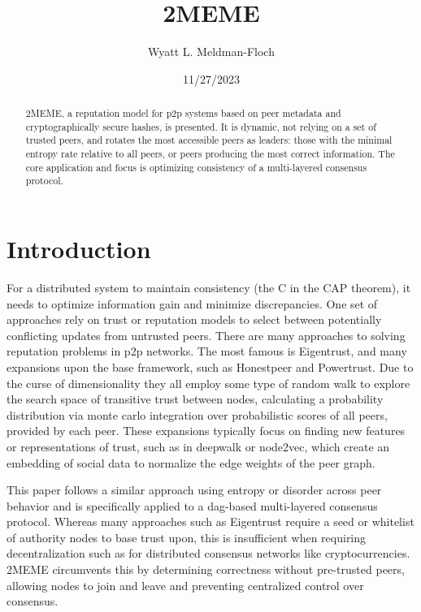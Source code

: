 \documentclass{article}
\title{2MEME}
\author{Wyatt L. Meldman-Floch}
\date{11/27/2023}
\begin{document}
\maketitle

\begin{abstract}
2MEME, a reputation model for p2p systems based on peer metadata and cryptographically secure hashes, is presented. It is dynamic, not relying on a set of trusted peers, and rotates the most accessible peers as leaders: those with the minimal entropy rate relative to all peers, or peers producing the most correct information. The core application and focus is optimizing consistency of a multi-layered consensus protocol. 

\end{abstract}

\tableofcontents

\setcounter{secnumdepth}{0}


\section{Introduction}
For a distributed system to maintain consistency (the C in the CAP theorem), it needs to optimize information gain and minimize discrepancies. One set of approaches rely on trust or reputation models to select between potentially conflicting updates from untrusted peers. There are many approaches to solving reputation problems in p2p networks. The most famous is Eigentrust, and many expansions upon the base framework, such as Honestpeer and Powertrust. Due to the curse of dimensionality they all employ some type of random walk to explore the search space of transitive trust between nodes, calculating a probability distribution via monte carlo integration over probabilistic scores of all peers, provided by each peer. These expansions typically focus on finding new features or representations of trust, such as in deepwalk or node2vec, which create an embedding of social data to normalize the edge weights of the peer graph.

This paper follows a similar approach using entropy or disorder across peer behavior and is specifically applied to a dag-based multi-layered consensus protocol. Whereas many approaches such as Eigentrust require a seed or whitelist of authority nodes to base trust upon, this is insufficient when requiring decentralization such as for distributed consensus networks like cryptocurrencies. 2MEME circumvents this by determining correctness without pre-trusted peers, allowing nodes to join and leave and preventing centralized control over consensus.
\end{document}
